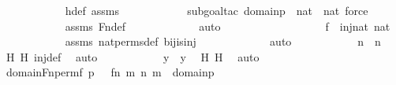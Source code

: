 \begin{isabellebody}
\ \ \ \ \ \ \ \ \ \ \isamarkupfalse%
\ h{\isacharunderscore}{\kern0pt}def\ assms{}\ \isanewline
\ \ \ \ \ \ \ \ \ \ \isamarkupfalse%
{\isacharparenleft}{\kern0pt}subgoal{\isacharunderscore}{\kern0pt}tac\ {\isachardoublequoteopen}domain{\isacharparenleft}{\kern0pt}p{\isacharparenright}{\kern0pt}\ {\isasymsubseteq}\ nat\ {\isasymtimes}\ nat{\isachardoublequoteclose}{\isacharcomma}{\kern0pt}\ force{\isacharparenright}{\kern0pt}\isanewline
\ \ \ \ \ \ \ \ \ \ \isamarkupfalse%
\ assms\ Fn{\isacharunderscore}{\kern0pt}def\ \isanewline
\ \ \ \ \ \ \ \ \ \ \isamarkupfalse%
\ auto\isanewline
\ \ \ \ \ \ \ \ \isanewline
\ \ \ \ \ \ \ \ \isamarkupfalse%
\ {\isachardoublequoteopen}f\ {\isasymin}\ inj{\isacharparenleft}{\kern0pt}nat{\isacharcomma}{\kern0pt}\ nat{\isacharparenright}{\kern0pt}{\isachardoublequoteclose}\ \isanewline
\ \ \ \ \ \ \ \ \ \ \isamarkupfalse%
\ assms\ nat{\isacharunderscore}{\kern0pt}perms{\isacharunderscore}{\kern0pt}def\ bij{\isacharunderscore}{\kern0pt}is{\isacharunderscore}{\kern0pt}inj\ \isanewline
\ \ \ \ \ \ \ \ \ \ \isamarkupfalse%
\ auto\isanewline
\ \ \ \ \ \ \ \ \isamarkupfalse%
\ \isamarkupfalse%
\ {\isachardoublequoteopen}n\ {\isacharequal}{\kern0pt}\ n{\isacharprime}{\kern0pt}{\isachardoublequoteclose}\ \isamarkupfalse%
\ H\ H{\isacharprime}{\kern0pt}\ inj{\isacharunderscore}{\kern0pt}def\ \isamarkupfalse%
\ auto\isanewline
\ \ \ \ \ \ \ \ \isamarkupfalse%
\ \isamarkupfalse%
\ {\isachardoublequoteopen}y\ {\isacharequal}{\kern0pt}\ y{\isacharprime}{\kern0pt}{\isachardoublequoteclose}\ \isamarkupfalse%
\ H\ H{\isacharprime}{\kern0pt}\ \isamarkupfalse%
\ auto\isanewline
\ \ \ \ \ \ \isamarkupfalse%
\isanewline
\ \ \ \ \isamarkupfalse%
\ \isanewline
\ \ \ \ \ \ \isamarkupfalse%
\ {\isachardoublequoteopen}domain{\isacharparenleft}{\kern0pt}Fn{\isacharunderscore}{\kern0pt}perm{\isacharparenleft}{\kern0pt}f{\isacharcomma}{\kern0pt}\ p{\isacharparenright}{\kern0pt}{\isacharparenright}{\kern0pt}\ {\isacharequal}{\kern0pt}\ {\isacharbraceleft}{\kern0pt}\ {\isacharless}{\kern0pt}f{\isacharbackquote}{\kern0pt}n{\isacharcomma}{\kern0pt}\ m{\isachargreater}{\kern0pt}{\isachardot}{\kern0pt}\ {\isacharless}{\kern0pt}n{\isacharcomma}{\kern0pt}\ m{\isachargreater}{\kern0pt}\ {\isasymin}\ domain{\isacharparenleft}{\kern0pt}p{\isacharparenright}{\kern0pt}\ {\isacharbraceright}{\kern0pt}{\isachardoublequoteclose}\ \isanewline

\end{isabellebody}
